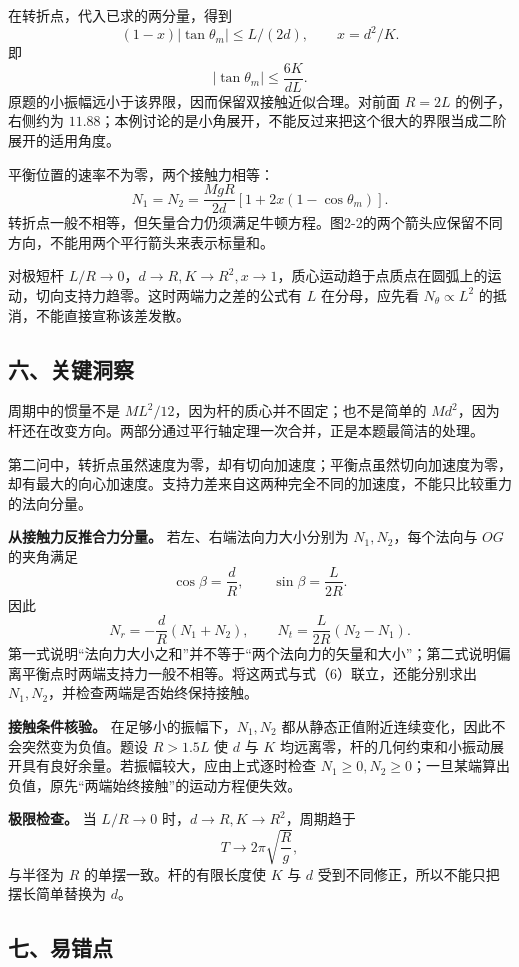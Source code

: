 \documentclass[12pt,a4paper,UTF8]{ctexart}
\begin{document}
在转折点，代入已求的两分量，得到 \[
(1-x)|\tan\theta_m|\le L/(2d),\qquad x=d^2/K.
\] 即 \[
|\tan\theta_m|\le\frac{6K}{dL}.
\] 原题的小振幅远小于该界限，因而保留双接触近似合理。对前面 \(R=2L\)
的例子，右侧约为
\(11.88\)；本例讨论的是小角展开，不能反过来把这个很大的界限当成二阶展开的适用角度。

平衡位置的速率不为零，两个接触力相等： \[
N_1=N_2=\frac{MgR}{2d}[1+2x(1-\cos\theta_m)].
\]
转折点一般不相等，但矢量合力仍须满足牛顿方程。图2-2的两个箭头应保留不同方向，不能用两个平行箭头来表示标量和。

对极短杆
\(L/R\to0\)，\(d\to R,K\to R^2,x\to1\)，质心运动趋于点质点在圆弧上的运动，切向支持力趋零。这时两端力之差的公式有
\(L\) 在分母，应先看 \(N_\theta\propto L^2\)
的抵消，不能直接宣称该差发散。

\subsection{六、关键洞察}\label{ux516dux5173ux952eux6d1eux5bdf-1}

周期中的惯量不是 \(ML^2/12\)，因为杆的质心并不固定；也不是简单的
\(Md^2\)，因为杆还在改变方向。两部分通过平行轴定理一次合并，正是本题最简洁的处理。

第二问中，转折点虽然速度为零，却有切向加速度；平衡点虽然切向加速度为零，却有最大的向心加速度。支持力差来自这两种完全不同的加速度，不能只比较重力的法向分量。

\textbf{从接触力反推合力分量。} 若左、右端法向力大小分别为
\(N_1,N_2\)，每个法向与 \(OG\) 的夹角满足 \[
\cos\beta=\frac dR,\qquad
\sin\beta=\frac{L}{2R}.
\] 因此 \[
N_r=-\frac dR(N_1+N_2),\qquad
N_t=\frac{L}{2R}(N_2-N_1).
\]
第一式说明``法向力大小之和''并不等于``两个法向力的矢量和大小''；第二式说明偏离平衡点时两端支持力一般不相等。将这两式与式（6）联立，还能分别求出
\(N_1,N_2\)，并检查两端是否始终保持接触。

\textbf{接触条件核验。} 在足够小的振幅下，\(N_1,N_2\)
都从静态正值附近连续变化，因此不会突然变为负值。题设 \(R>1.5L\) 使 \(d\)
与 \(K\)
均远离零，杆的几何约束和小振动展开具有良好余量。若振幅较大，应由上式逐时检查
\(N_1\ge0,N_2\ge0\)；一旦某端算出负值，原先``两端始终接触''的运动方程便失效。

\textbf{极限检查。} 当 \(L/R\to0\) 时，\(d\to R,K\to R^2\)，周期趋于 \[
T\to2\pi\sqrt{\frac Rg},
\] 与半径为 \(R\) 的单摆一致。杆的有限长度使 \(K\) 与 \(d\)
受到不同修正，所以不能只把摆长简单替换为 \(d\)。

\subsection{七、易错点}\label{ux4e03ux6613ux9519ux70b9-1}
\end{document}
